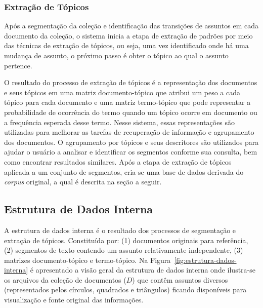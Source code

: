 




\subsubsection{Extração de Tópicos}

Após a segmentação da coleção e identificação das transições de assuntos em cada documento da coleção, o sistema inicia a etapa de extração de padrões por meio das técnicas de extração de tópicos, ou seja, uma vez identificado onde há uma mudança de assunto, o próximo passo é obter o tópico ao qual o assunto pertence.

O resultado do processo de extração de tópicos é a representação dos documentos e seus tópicos em uma matriz documento-tópico que atribui um peso a cada tópico para cada documento e uma matriz termo-tópico que pode representar a probabilidade de ocorrência do termo quando um tópico ocorre em documento ou a frequência esperada desse termo.  
Nesse sistema, essas representações são utilizadas para melhorar as tarefas de recuperação de informação e agrupamento dos documentos. 
O agrupamento por tópicos e seus descritores são utilizados para ajudar o usuário a analisar e identificar os segmentos conforme sua consulta, bem como encontrar resultados similares. 
Após a etapa de extração de tópicos aplicada a um conjunto de segmentos,  cria-se uma base de dados derivada do \textit{corpus} original, a qual é descrita na seção a seguir.








\subsection{Estrutura de Dados Interna}

A estrutura de dados interna é o resultado dos processos de segmentação e extração de tópicos. Constituída por: 
(1) documentos originais para referência, 
(2) segmentos de texto contendo um assunto relativamente independente,
(3) matrizes documento-tópico e termo-tópico.
Na Figura~\ref{fig:estrutura-dados-interna} é apresentado a visão geral da estrutura de dados interna onde ilustra-se os arquivos da coleção de documentos ($D$) que contêm assuntos diversos (representados pelos círculos, quadrados e triângulos) ficando disponíveis para visualização e fonte original das informações. 


